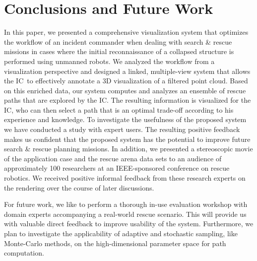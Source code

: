 \documentclass[conference,10pt,letter]{IEEEtran}
\def\IC{IC}
\begin{document}
\section{Conclusions and Future Work} \label{sec:conclusion}
In this paper, we presented a comprehensive visualization system that optimizes the workflow of an incident commander when dealing with search \& rescue missions in cases where the initial reconnaissance of a collapsed structure is performed using unmanned robots. We analyzed the workflow from a visualization perspective and designed a linked, multiple-view system that allows the \IC\ to effectively annotate a 3D visualization of a filtered point cloud. Based on this enriched data, our system computes and analyzes an ensemble of rescue paths that are explored by the \IC . The resulting information is visualized for the \IC , who can then select a path that is an optimal trade-off according to his experience and knowledge. To investigate the usefulness of the proposed system we have conducted a study with expert users. The resulting positive feedback makes us confident that the proposed system has the potential to improve future search \& rescue planning missions. In addition, we presented a stereoscopic movie of the application case and the rescue arena data sets to an audience of approximately 100 researchers at an IEEE-sponsored conference on rescue robotics. We received positive informal feedback from these research experts on the rendering over the course of later discussions.

For future work, we like to perform a thorough in-use evaluation workshop with domain experts accompanying a real-world rescue scenario. This will provide us with valuable direct feedback to improve usability of the system. Furthermore, we plan to investigate the applicability of adaptive and stochastic sampling, like Monte-Carlo methods, on the high-dimensional parameter space for path computation.



%
%



\end{document}
